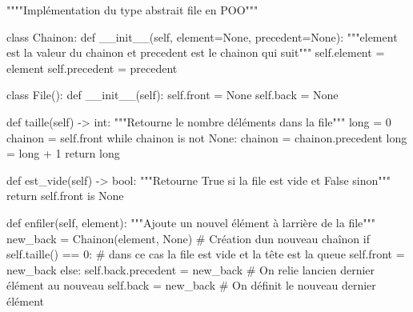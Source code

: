 \documentclass[
  a4paper,
  DIV=11,
  numbers=noendperiod]{scrartcl}
\newenvironment{Shaded}{\begin{snugshade}}{\end{snugshade}}
\newcommand{\BuiltInTok}[1]{\textcolor[rgb]{0.00,0.23,0.31}{#1}}
\newcommand{\CommentTok}[1]{\textcolor[rgb]{0.37,0.37,0.37}{#1}}
\newcommand{\ControlFlowTok}[1]{\textcolor[rgb]{0.00,0.23,0.31}{#1}}
\newcommand{\DecValTok}[1]{\textcolor[rgb]{0.68,0.00,0.00}{#1}}
\newcommand{\FunctionTok}[1]{\textcolor[rgb]{0.28,0.35,0.67}{#1}}
\newcommand{\KeywordTok}[1]{\textcolor[rgb]{0.00,0.23,0.31}{#1}}
\newcommand{\NormalTok}[1]{\textcolor[rgb]{0.00,0.23,0.31}{#1}}
\newcommand{\OperatorTok}[1]{\textcolor[rgb]{0.37,0.37,0.37}{#1}}
\newcommand{\VariableTok}[1]{\textcolor[rgb]{0.07,0.07,0.07}{#1}}
\begin{document}
\begin{Shaded}
\begin{Highlighting}[]
\CommentTok{""""Implémentation du type abstrait file en POO"""}


\KeywordTok{class}\NormalTok{ Chainon:}
    \KeywordTok{def} \FunctionTok{\_\_init\_\_}\NormalTok{(}\VariableTok{self}\NormalTok{, element}\OperatorTok{=}\VariableTok{None}\NormalTok{, precedent}\OperatorTok{=}\VariableTok{None}\NormalTok{):}
        \CommentTok{"""element est la valeur du chainon et precedent est le chainon qui suit"""}
        \VariableTok{self}\NormalTok{.element }\OperatorTok{=}\NormalTok{ element}
        \VariableTok{self}\NormalTok{.precedent }\OperatorTok{=}\NormalTok{ precedent}


\KeywordTok{class}\NormalTok{ File():}
    \KeywordTok{def} \FunctionTok{\_\_init\_\_}\NormalTok{(}\VariableTok{self}\NormalTok{):}
        \VariableTok{self}\NormalTok{.front }\OperatorTok{=} \VariableTok{None}
        \VariableTok{self}\NormalTok{.back }\OperatorTok{=} \VariableTok{None}

    \KeywordTok{def}\NormalTok{ taille(}\VariableTok{self}\NormalTok{) }\OperatorTok{{-}\textgreater{}} \BuiltInTok{int}\NormalTok{:}
        \CommentTok{"""Retourne le nombre d\textquotesingle{}éléments dans la file"""}
        \BuiltInTok{long} \OperatorTok{=} \DecValTok{0}
\NormalTok{        chainon }\OperatorTok{=} \VariableTok{self}\NormalTok{.front}
        \ControlFlowTok{while}\NormalTok{ chainon }\KeywordTok{is} \KeywordTok{not} \VariableTok{None}\NormalTok{:}
\NormalTok{            chainon }\OperatorTok{=}\NormalTok{ chainon.precedent}
            \BuiltInTok{long} \OperatorTok{=} \BuiltInTok{long} \OperatorTok{+} \DecValTok{1}
        \ControlFlowTok{return} \BuiltInTok{long}

    \KeywordTok{def}\NormalTok{ est\_vide(}\VariableTok{self}\NormalTok{) }\OperatorTok{{-}\textgreater{}} \BuiltInTok{bool}\NormalTok{:}
        \CommentTok{"""Retourne True si la file est vide et False sinon"""}
        \ControlFlowTok{return} \VariableTok{self}\NormalTok{.front }\KeywordTok{is} \VariableTok{None}

    \KeywordTok{def}\NormalTok{ enfiler(}\VariableTok{self}\NormalTok{, element):}
        \CommentTok{"""Ajoute un nouvel élément à l\textquotesingle{}arrière de la file"""}
\NormalTok{        new\_back }\OperatorTok{=}\NormalTok{ Chainon(element, }\VariableTok{None}\NormalTok{)   }\CommentTok{\# Création d\textquotesingle{}un nouveau chaînon}
        \ControlFlowTok{if} \VariableTok{self}\NormalTok{.taille() }\OperatorTok{==} \DecValTok{0}\NormalTok{:}
            \CommentTok{\# dans ce cas la file est vide et la tête est la queue}
            \VariableTok{self}\NormalTok{.front }\OperatorTok{=}\NormalTok{ new\_back}
        \ControlFlowTok{else}\NormalTok{:}
            \VariableTok{self}\NormalTok{.back.precedent }\OperatorTok{=}\NormalTok{ new\_back    }\CommentTok{\# On relie l\textquotesingle{}ancien dernier élément au nouveau}
        \VariableTok{self}\NormalTok{.back }\OperatorTok{=}\NormalTok{ new\_back    }\CommentTok{\# On définit le nouveau dernier élément}


\end{Highlighting}
\end{Shaded}
\end{document}
